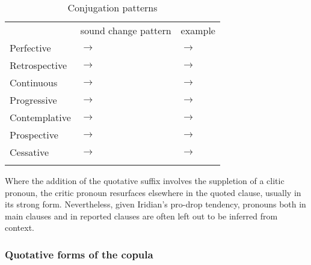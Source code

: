 \begin{table}
	\footnotesize\sffamily
	\caption{Conjugation patterns}
	\label{tbl:quotind}
	\begin{tabu} to 0.9\textwidth {YYY}
		\toprule
										&	{\sc sound change pattern}				& {\sc example}\\
										\addlinespace
		\midrule
			\addlinespace
				Perfective 		&
				 $\rightarrow$ 	&
				 $\rightarrow$ \\
			\addlinespace
				Retrospective &
				 $\rightarrow$  &
				 $\rightarrow$ \\
			\addlinespace
				Continuous &
				 $\rightarrow$  &
				 $\rightarrow$ \\
			\addlinespace
				Progressive &
				 $\rightarrow$  &
				 $\rightarrow$ \\
			\addlinespace
				Contemplative &
				 $\rightarrow$  &
				 $\rightarrow$ \\
			\addlinespace
				Prospective &
				 $\rightarrow$  &
				 $\rightarrow$ \\
			\addlinespace
				Cessative &
				 $\rightarrow$  &
				 $\rightarrow$ \\
			\addlinespace

			\bottomrule
	\end{tabu}

\end{table}

Where the addition of the quotative suffix  involves the suppletion of a clitic pronoun, the critic pronoun resurfaces elsewhere in the quoted clause, usually in its strong form. Nevertheless, given Iridian's pro-drop tendency, pronouns both in main clauses and in reported clauses are often left out to be inferred from context.

\subsubsection{Quotative forms of the copula}

